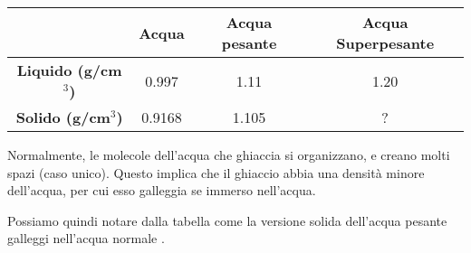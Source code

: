 \documentclass[a4paper]{article}
\begin{document}
\begin{center}
    \bgroup{}
    \def\arraystretch{1.25}
    \begin{tabular}{ |c|c|c|c| }
        \hline
        & \textbf{Acqua} & \textbf{Acqua pesante} & \textbf{Acqua Superpesante} \\
        \hline
        \textbf{Liquido (g/cm\(^3\))} & 0.997 & 1.11 & 1.20 \\
        \hline
        \textbf{Solido (g/cm\(^3\))} & 0.9168 & 1.105 & ? \\
        \hline
    \end{tabular}
    \egroup{}
\end{center}

Normalmente, le molecole dell'acqua che ghiaccia si organizzano, e creano molti spazi (caso unico).
Questo implica che il ghiaccio abbia una densità minore dell'acqua, per cui esso galleggia se immerso nell'acqua.

Possiamo quindi notare dalla tabella come la versione solida dell'acqua pesante galleggi
nell'acqua normale \cite{deuterated-water}.

\nocite{*} %

\printbibliography

\end{document}
